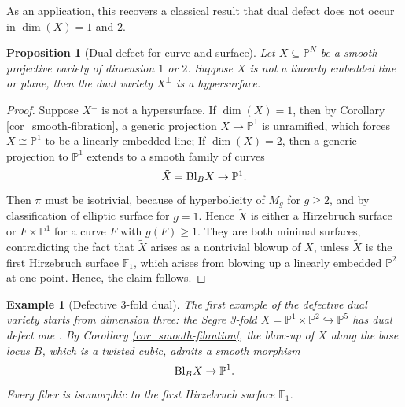 \documentclass[12pt]{amsart}
\newtheorem{proposition}[theorem]{Proposition}
\newtheorem{example}[theorem]{Example}
\begin{document}

As an application, this recovers a classical result that dual defect does not occur in $\dim(X)=1$ and $2$.


\begin{proposition}[Dual defect for curve and surface] \cite[Proposition 3.1]{Ein86}\label{prop_no-defect-dim1,2}
   Let $X\subseteq \mathbb P^N$ be a smooth projective variety of dimension $1$ or $2$. Suppose $X$ is not a linearly embedded line or plane, then the dual variety $X^{\perp}$ is a hypersurface.
\end{proposition}
\begin{proof}
 Suppose $X^{\perp}$ is not a hypersurface. If $\dim(X)=1$, then by Corollary \ref{cor_smooth-fibration}, a generic projection $X\to \mathbb P^1$ is unramified, which forces $X\cong \mathbb P^1$ to be a linearly embedded line; If $\dim(X)=2$, then a generic projection to $\mathbb P^1$ extends to a smooth family of curves
    $$\tilde{X}=\textup{Bl}_BX\to \mathbb P^1.$$
Then $\pi$ must be isotrivial, because of hyperbolicity of $M_g$ for $g\ge 2$, and by classification of elliptic surface for $g=1$. Hence $\tilde{X}$ is either a Hirzebruch surface or $F\times \mathbb P^1$ for a curve $F$ with $g(F)\ge 1$. They are both minimal surfaces, contradicting the fact that $\tilde{X}$ arises as a nontrivial blowup of $X$, unless $\tilde{X}$ is the first Hirzebruch surface $\mathbb F_1$, which arises from blowing up a linearly embedded $\mathbb P^2$ at one point. Hence, the claim follows.
    \end{proof}
\begin{example}[Defective 3-fold dual] \normalfont\label{example_segre3fold}
     The first example of the defective dual variety starts from dimension three: the Segre 3-fold $X=\mathbb P^1\times \mathbb P^2\hookrightarrow \mathbb P^5$ has dual defect one \cite{Ein86}. By Corollary \ref{cor_smooth-fibration}, the blow-up of $X$ along the base locus $B$, which is a twisted cubic, admits a smooth morphism
     $$\textup{Bl}_BX\to \mathbb P^1.$$
     Every fiber is isomorphic to the first Hirzebruch surface $\mathbb F_1$.

\end{example}
\end{document}
